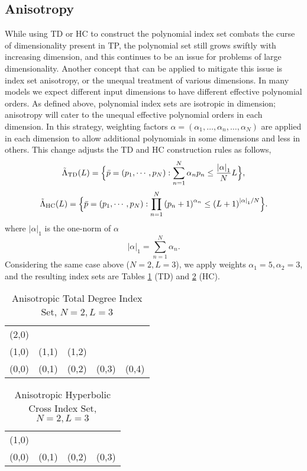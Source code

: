 \subsection{Anisotropy}
While using TD or HC to construct the polynomial index set combats the curse of dimensionality present in TP,
the polynomial set still grows swiftly with increasing dimension, and this continues to be an issue for problems 
of large dimensionality.  Another concept that can
be applied to mitigate this issue is index set anisotropy, or the unequal treatment of various dimensions.
In many models we expect different input dimensions to have different effective polynomial orders.  As defined
above, polynomial index sets are isotropic in dimension; anisotropy will cater to the unequal effective
polynomial orders in each dimension.
In this strategy, weighting factors $\alpha=(\alpha_1,\ldots,\alpha_n,\ldots,\alpha_N)$ are applied in each
dimension to allow additional polynomials in some dimensions and less in others.  This change adjusts the TD
and HC construction rules as follows,
\begin{equation}
  \tilde\Lambda_\text{TD}(L)=\Big\{\bar p=(p_1,\cdots,p_N):\sum_{n=1}^N \alpha_n p_n \leq 
  \frac{\qty|\mathbf{\alpha}|_1}{N} L \Big\},
\end{equation}
\begin{equation}
  \tilde\Lambda_\text{HC}(L)=\Big\{\bar p=(p_1,\cdots,p_N):\prod_{n=1}^N \qty(p_n+1)^{\alpha_n} \leq
  \qty(L+1)^{\qty|\mathbf{\alpha}|_1/N} \Big\}.
\end{equation}
where $|\alpha|_1$ is the one-norm of $\alpha$
\begin{equation}
  |\alpha|_1 = \sum_{n=1}^N \alpha_n.
\end{equation}
Considering the same case above ($N=2,L=3$), we apply weights $\alpha_1=5,\alpha_2=3$, and the resulting index
sets are Tables \ref{tab:aniTD} (TD) and \ref{tab:aniHC} (HC).

\begin{table}[h]
  \centering
  \begin{tabular}{c c c c c}
    (2,0) &       &       &       & \\
    (1,0) & (1,1) & (1,2) &       & \\
    (0,0) & (0,1) & (0,2) & (0,3) & (0,4)
  \end{tabular}
  \caption{Anisotropic Total Degree Index Set, $N=2,L=3$}
  \label{tab:aniTD}
\end{table}

\begin{table}[h]
  \centering
  \begin{tabular}{c c c c}
    (1,0) &       &       &       \\
    (0,0) & (0,1) & (0,2) & (0,3)
  \end{tabular}
  \caption{Anisotropic Hyperbolic Cross Index Set, $N=2,L=3$}
  \label{tab:aniHC}
\end{table}

